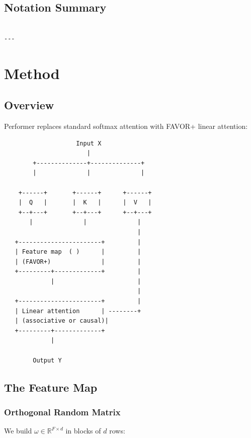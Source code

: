 \subsection{Notation Summary}

\begin{lstlisting}

---
\end{lstlisting}


\section{Method}

\subsection{Overview}

Performer replaces standard softmax attention with FAVOR+ linear attention:

\begin{lstlisting}
                    Input X
                       |
        +--------------+--------------+
        |              |              |
                                       
    +------+       +------+      +------+
    |  Q   |       |  K   |      |  V   |
    +--+---+       +--+---+      +--+---+
       |              |              |
                                     |
   +-----------------------+         |
   | Feature map  ( )      |         |
   | (FAVOR+)              |         |
   +---------+-------------+         |
             |                       |
                                     |
   +-----------------------+         |
   | Linear attention      | --------+
   | (associative or causal)|
   +---------+-------------+
             |
              
        Output Y
\end{lstlisting}

\subsection{The Feature Map}

\subsubsection{Orthogonal Random Matrix}

We build $\omega \in \mathbb{R}^{F \times d}$ in blocks of $d$ rows:

